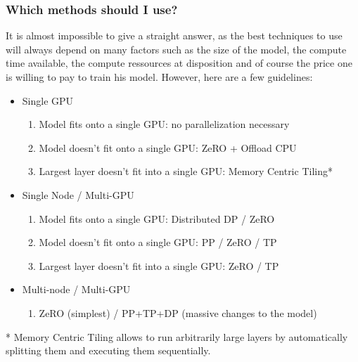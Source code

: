 \documentclass{article}
\begin{document}
\subsubsection{Which methods should I use?}
It is almost impossible to give a straight answer, as the best techniques to use will always depend on many factors such as the size of the model, the compute time available, the compute ressources at disposition and of course the price one is willing to pay to train his model. However, here are a few guidelines:
\begin{itemize}
  \item Single GPU
  \begin{enumerate}
    \item Model fits onto a single GPU: no parallelization necessary
    \item Model doesn't fit onto a single GPU: ZeRO + Offload CPU
    \item Largest layer doesn't fit into a single GPU: Memory Centric Tiling*
  \end{enumerate}
  \item Single Node / Multi-GPU
  \begin{enumerate}
    \item Model fits onto a single GPU: Distributed DP / ZeRO
    \item Model doesn't fit onto a single GPU: PP / ZeRO / TP
    \item Largest layer doesn't fit into a single GPU: ZeRO / TP
  \end{enumerate}
  \item Multi-node / Multi-GPU
  \begin{enumerate}
    \item ZeRO (simplest) / PP+TP+DP (massive changes to the model)
  \end{enumerate}
\end{itemize}

* Memory Centric Tiling allows to run arbitrarily large layers by automatically splitting them and executing them sequentially.
\end{document}
